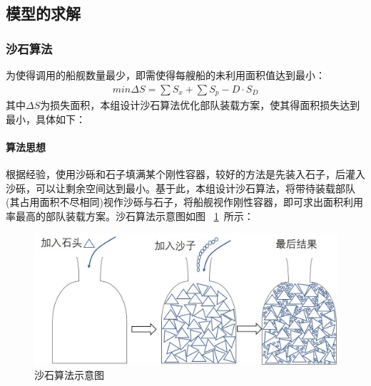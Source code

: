 \documentclass{whutmod}
\begin{document}
    		    	
	\subsection{模型的求解}   
    	  \subsubsection{沙石算法}
		为使得调用的船舰数量最少，即需使得每艘船的未利用面积值达到最小：
	    \begin{gather*}
		min \Delta S= \sum  S_{x} + \sum  S_{p}-D\cdot S_{D} 
		\end{gather*}
	其中$\Delta S$为损失面积，本组设计沙石算法优化部队装载方案，使其得面积损失达到最小，具体如下：
	 \paragraph{算法思想}
	 根据经验，使用沙砾和石子填满某个刚性容器，较好的方法是先装入石子，后灌入沙砾，可以让剩余空间达到最小。基于此，本组设计沙石算法，将带待装载部队(其占用面积不尽相同)视作沙砾与石子，将船舰视作刚性容器，即可求出面积利用率最高的部队装载方案。沙石算法示意图如图 ~\ref{shashi}~所示：
	 
	 
	 \begin{figure}[H]
	 	\centering
	 	\includegraphics[width=.8\textwidth]{figures/shashi.jpg}
	 	\caption{沙石算法示意图}\label{shashi}
	 \end{figure}
	 
\end{document}
